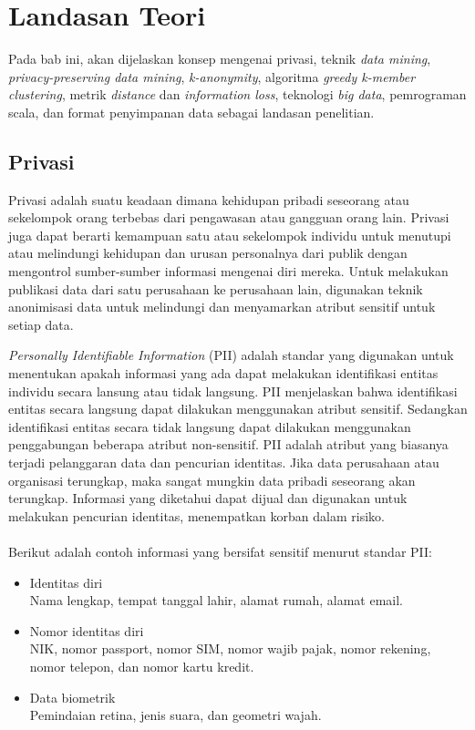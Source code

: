 \chapter{Landasan Teori}
\label{chap:teori}
Pada bab ini, akan dijelaskan konsep mengenai privasi, teknik \textit{data mining}, \textit{privacy-preserving data mining}, \textit{k-anonymity}, algoritma \textit{greedy k-member clustering}, metrik \textit{distance} dan \textit{information loss}, teknologi \textit{big data}, pemrograman scala, dan format penyimpanan data sebagai landasan penelitian.

\section{Privasi}
\label{sec:privasi}
Privasi adalah suatu keadaan dimana kehidupan pribadi seseorang atau sekelompok orang terbebas dari pengawasan atau gangguan orang lain. Privasi juga dapat berarti kemampuan satu atau sekelompok individu untuk menutupi atau melindungi kehidupan dan urusan personalnya dari publik dengan mengontrol sumber-sumber informasi mengenai diri mereka. Untuk melakukan publikasi data dari satu perusahaan ke perusahaan lain, digunakan teknik anonimisasi data untuk melindungi dan menyamarkan atribut sensitif untuk setiap data.

\par \textit{Personally Identifiable Information} (PII) adalah standar yang digunakan untuk menentukan apakah informasi yang ada dapat melakukan identifikasi entitas individu secara lansung atau tidak langsung. PII menjelaskan bahwa identifikasi entitas secara langsung dapat dilakukan menggunakan atribut sensitif. Sedangkan identifikasi entitas secara tidak langsung dapat dilakukan menggunakan penggabungan beberapa atribut non-sensitif. PII adalah atribut  yang biasanya terjadi pelanggaran data dan pencurian identitas. Jika data perusahaan atau organisasi terungkap, maka sangat mungkin data pribadi seseorang akan terungkap. Informasi yang diketahui dapat dijual dan digunakan untuk melakukan pencurian identitas, menempatkan korban dalam risiko.
\\\\
Berikut adalah contoh informasi yang bersifat sensitif menurut standar PII:

\begin{itemize}
\item Identitas diri \\ 
Nama lengkap, tempat tanggal lahir, alamat rumah, alamat email.
\item Nomor identitas diri \\
NIK, nomor passport, nomor SIM, nomor wajib pajak, nomor rekening, nomor telepon, dan nomor kartu kredit.
\item Data biometrik \\
Pemindaian retina, jenis suara, dan geometri wajah.
\end{itemize}

